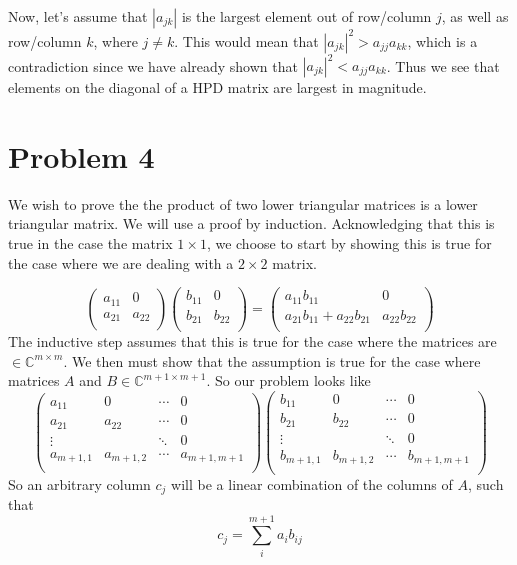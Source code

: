 \documentclass[12pt,a4paper,twoside]{article}
\begin{document}
Now, let's assume that $|a_{jk}|$ is the largest element out of row/column $j$, as well as row/column $k$, where $j\neq k$. This would mean that $|a_{jk}|^2 > a_{jj}a_{kk}$, which is a contradiction since we have already shown that  $|a_{jk}|^2 < a_{jj} a_{kk}$. Thus we see that elements on the diagonal of a HPD matrix are largest in magnitude. 







\section{Problem 4}
We wish to prove the the product of two lower triangular matrices is a lower triangular matrix. We will use a proof by induction. Acknowledging that this is true in the case the matrix $1\times 1$, we choose to start by showing this is true for the case where we are dealing with a $2\times 2$ matrix.

\begin{equation}
\begin{pmatrix}
a_{11}& 0\\
a_{21}& a_{22}\\
\end{pmatrix}
\begin{pmatrix}
b_{11}&0\\
b_{21}&b_{22}\\
\end{pmatrix}=
\begin{pmatrix}
a_{11}b_{11}&0\\
a_{21}b_{11}+a_{22}b_{21}&a_{22}b_{22}\\
\end{pmatrix}
\end{equation}
The inductive step assumes that this is true for the case where the matrices are $\in \mathbb{C}^{m \times m}$. We then must show that the assumption is true for the case where matrices $A$ and $B \in \mathbb{C}^{m+1 \times m+1}$. So our problem looks like
\begin{equation}
\begin{pmatrix}
a_{11}& 0 & \cdots & 0\\
a_{21}& a_{22}&\cdots&0\\
\vdots &           & \ddots&0\\
a_{m+1, 1}& a_{m+1, 2}&\cdots& a_{m+1,m+1}\\
\end{pmatrix}
\begin{pmatrix}
b_{11}& 0 & \cdots & 0\\
b_{21}& b_{22}&\cdots&0\\
\vdots &           & \ddots&0\\
b_{m+1, 1}& b_{m+1, 2}&\cdots& b_{m+1,m+1}\\
\end{pmatrix}
\end{equation} So an arbitrary column $c_j$ will be a linear combination of the columns of $A$, such that
\begin{equation}
c_j= \sum_{i}^{m+1} a_i b_{ij}
\end{equation}
\end{document}
